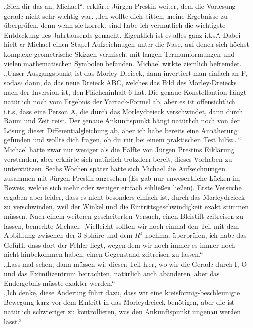 \documentclass[oneside]{memoir}
\begin{document}
 „Sieh dir das an, Michael“, erklärte Jürgen Prestin weiter, dem die Vorlesung gerade nicht sehr wichtig war. „Ich wollte dich bitten, meine Ergebnisse zu überprüfen, denn wenn sie korrekt sind habe ich vermutlich die wichtigste Entdeckung des Jahrtausends gemacht. Eigentlich ist es alles ganz i.t.s.“. Dabei hielt er Michael einen Stapel Aufzeichnugen unter die Nase, auf denen sich höchst komplexe geometrische Skizzen vermischt mit langen Termumformungen und vielen mathematischen Symbolen befanden. Michael wirkte ziemlich befremdet. \\
„Unser Ausgangspunkt ist das Morley-Dreieck, dann invertiert man einfach an P, sodass dann, da das neue Dreieck ABC, welches das Bild des Morley-Dreiecks nach der Inversion ist, den Flächeninhalt 6 hat. Die genaue Konstellantion hängt natürlich noch vom Ergebnis der Yarrack-Formel ab, aber es ist offensichtlich i.t.s, dass eine Person A, die durch das Morleydreieck verschwindet, dann durch Raum und Zeit reist. Der genaue Ankunftspunkt hängt natürlich noch von der Lösung dieser Differentialgleichung ab, aber ich habe bereits eine Annäherung gefunden und wollte dich fragen, ob du mir bei einem praktischen Test hilfst\ldots“ \\
 Michael hatte zwar nur  weniger als die Hälfte von Jürgen Prestins Erklärung verstanden, aber erklärte sich natürlich trotzdem bereit, dieses Vorhaben zu unterstützen. Sechs Wochen  später hatte sich Michael die Aufzeichnungen zusammen mit Jürgen Prestin angesehen (Es gab nur unwesentliche Lücken im Beweis, welche sich mehr oder weniger einfach schließen ließen). Erste Versuche ergaben aber leider, dass es nicht besonders einfach ist, durch das Morleydreieck zu verschwinden, weil der Winkel und die Eintrittsgeschwindigkeit exakt stimmen müssen. Nach einem weiteren gescheiterten Versuch, einen Bleistift zeitreisen zu lassen, bemerkte Michael: „Vielleicht sollten wir noch einmal den Teil mit dem Abbildung zwischen der 3-Sphäre und dem $R^3$ nochmal  überprüfen, ich habe das Gefühl, dass dort der Fehler liegt, wegen dem wir noch immer es immer noch nicht hinbekommen haben, einen Gegenstand zeitreisen zu lassen.“ \\
„Lass mal sehen, dann müssen wir diesen Teil hier, wo wir die Gerade durch I, O und das Eximilizentrum betrachten, natürlich auch abänderen, aber das Endergebnis müsste exakter werden.“ \\
„Ich denke, diese Änderung führt dazu, dass wir eine kreisförmig-beschleunigte Bewegung kurz vor dem Eintritt in das Morleydreieck benötigen, aber die ist natürlich schwieriger zu kontrollieren, was den Ankunftspunkt ungenau werden lässt.“ \\
\end{document}
